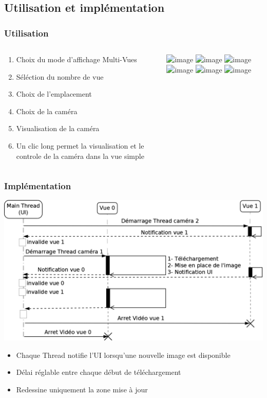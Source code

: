   \subsection{Utilisation et implémentation}
  \begin{frame}
   \frametitle{Utilisation}

\begin{columns}
\begin{column}{7cm}
\begin{enumerate}[<+->]
    \item Choix du mode d'affichage Multi-Vues
    \item Séléction du nombre de vue
  	\item Choix de l'emplacement
  	\item Choix de la caméra
  	\item Visualisation de la caméra
  	\item Un clic long permet la visualisation et le controle de la caméra dans
  	la vue simple
\end{enumerate}
\end{column}
\begin{column}{6cm}
  \centering \includegraphics<1>[width=3cm]{Images/mvstep/s1.jpg}
  \centering \includegraphics<2>[width=3cm]{Images/mvstep/s2.jpg}
  \centering\includegraphics<3>[width=5cm]{Images/mvstep/s3.jpg}
  \centering \includegraphics<4>[width=5cm]{Images/mvstep/s4.jpg}
  \centering \includegraphics<5>[width=5cm]{Images/mvstep/s5.jpg}
  \centering \includegraphics<6>[width=5cm]{Images/mvstep/s6.jpg}
\end{column}
\end{columns}

  \end{frame}
 
  \begin{frame}
   \frametitle{Implémentation}
\centering \includegraphics[scale=0.2]{Images/DiagrammeSequenceMultiView.png}

\begin{itemize}

    \item Chaque Thread notifie l'UI lorsqu'une nouvelle image est
    disponible
  	\item Délai réglable entre chaque début de téléchargement
  	\item Redessine uniquement la zone mise à jour
\end{itemize}
 \end{frame}
  
